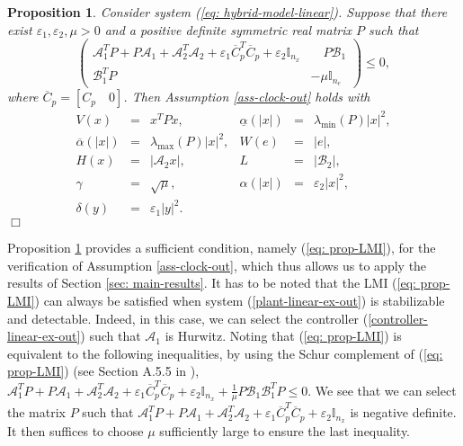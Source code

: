 \documentclass[a4paper, 9pt, twocolumn]{IEEEtran}
\theoremstyle{plain}
\newtheorem{props}{Proposition}
\theoremstyle{definition}
\begin{document}
\begin{props}\label{prop: linear-systems}
Consider system (\ref{eq: hybrid-model-linear}). Suppose that there exist $\varepsilon_{1}, \varepsilon_{2}, \mu > 0$ and a positive definite symmetric real matrix $P$ such that
\begin{equation}\label{eq: prop-LMI}
\left(\begin{array}{cccc} \mathcal{A}_{1}^{T}P + P\mathcal{A}_{1}+ \mathcal{A}_{2}^{T}\mathcal{A}_{2} + \varepsilon_{1}\overline{C}_{p}^{T}\overline{C}_{p} + \varepsilon_{2}\mathbb{I}_{n_{x}}  &\hspace{12pt} P\mathcal{B}_{1} \\ \mathcal{B}_{1}^{T}P & -\mu\mathbb{I}_{n_{e}} \end{array} \right)\leq 0,
\end{equation}
where $\overline{C}_{p} = [C_{p} \hspace{12pt} 0]$. Then Assumption \ref{ass-clock-out} holds with
\begin{equation*}
\begin{array}{llllllllllll}
V(x) &=& x^{T}Px, & \underline{\alpha}(|x|) &=& \lambda_{\min}(P)|x|^{2}, \\
\overline{\alpha}(|x|) &=& \lambda_{\max}(P)|x|^{2}, & W(e) &=& |e|, \\
H(x) &=& |\mathcal{A}_{2}x|, & L &=& |\mathcal{B}_{2}|, \\
\gamma &=& \sqrt{\mu}, & \alpha(|x|) &=& \varepsilon_{2}|x|^{2}, \\
\delta(y) &=& \varepsilon_{1}|y|^{2}.
\end{array}
\end{equation*}
\hspace*{\fill} $\Box$
\end{props}
\noindent Proposition \ref{prop: linear-systems} provides a sufficient condition, namely (\ref{eq: prop-LMI}), for the verification of Assumption \ref{ass-clock-out}, which thus allows us to apply the results of Section \ref{sec: main-results}. It has to be noted that the LMI (\ref{eq: prop-LMI}) can always be satisfied when system (\ref{plant-linear-ex-out}) is stabilizable and detectable. Indeed, in this case, we can select the controller (\ref{controller-linear-ex-out}) such that $ \mathcal{A}_1$ is Hurwitz.  Noting that (\ref{eq: prop-LMI}) is equivalent to the following inequalities, by using the Schur complement of (\ref{eq: prop-LMI}) (see Section A.5.5 in \cite{Boyd}), $ \mathcal{A}_{1}^{T}P + P\mathcal{A}_{1}+ \mathcal{A}_{2}^{T}\mathcal{A}_{2} + \varepsilon_{1}\overline{C}_{p}^{T}\overline{C}_{p} + \varepsilon_{2}\mathbb{I}_{n_{x}} + \frac{1}{\mu}P\mathcal{B}_{1}\mathcal{B}_{1}^{T}P \leq 0$. We see that we can select the matrix $P$ such that $\mathcal{A}_{1}^{T}P + P\mathcal{A}_{1}+ \mathcal{A}_{2}^{T}\mathcal{A}_{2} + \varepsilon_{1}\overline{C}_{p}^{T}\overline{C}_{p} + \varepsilon_{2}\mathbb{I}_{n_{x}}$ is negative definite. It then suffices to choose $\mu$ sufficiently large to ensure the last inequality.
\end{document}
